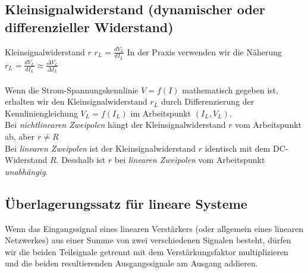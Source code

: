 		\subsection{Kleinsignalwiderstand (dynamischer oder differenzieller
		Widerstand)}
			Kleinsignalwiderstand $r$ \hspace{15mm} $r_L=\frac{dV_L}{dI_L}$ In der Praxis
			verwenden wir die Näherung $r_L=\frac{dV_L}{dI_L}\approx \frac{\Delta
			V_L}{\Delta I_L}$\\ \\
			Wenn die Strom-Spannungskennlinie $V=f(I)$ mathematisch gegeben ist, erhalten
			wir den Kleinsignalwiderstand $r_L$ durch Differenzierung der
			Kennliniengleichung $V_L=f(I_L)$ im Arbeitspunkt $(I_L, V_L)$.\\
			Bei {\it nichtlinearen Zweipolen} hängt der Kleinsignalwiderstand $r$
			vom Arbeitspunkt ab, aber $r\neq R$\\
			Bei {\it linearen Zweipolen} ist der Kleinsignalwiderstand $r$
			identisch mit dem DC-Widerstand $R$. Desshalb ist $r$ bei {\it linearen
			Zweipolen} vom Arbeitspunkt {\it unabhängig}.\\
		
	\subsection{Überlagerungssatz für lineare Systeme}
			Wenn das Eingangssignal eines linearen Verstärkers (oder allgemein eines
			linearen Netzwerkes) aus einer Summe von zwei verschiedenen Signalen besteht,
			dürfen wir die beiden Teilsignale getrennt mit dem Verstärkungsfaktor
			multiplizieren und die beiden resultierenden Ausgangssignale am Ausgang
			addieren.\\
			\hspace*{10mm}
			\\